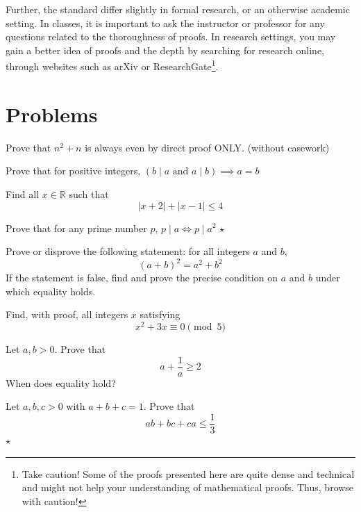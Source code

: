Further, the standard differ slightly in formal research, or an otherwise academic setting. In classes, it is important to ask the instructor or professor for any questions related to the thoroughness of proofs. In research settings, you may gain a better idea of proofs and the depth by searching for research online, through websites such as arXiv or ResearchGate\footnote{Take caution! Some of the proofs presented here are quite dense and technical and might not help your understanding of mathematical proofs. Thus, browse with caution!}. 


\section{Problems}

\begin{problem}
Prove that $n^2 + n$ is always even by direct proof ONLY. (without casework) 
\end{problem}

\begin{problem}
Prove that for positive integers, 
$
(b \mid a \text{ and } a \mid b) \implies a = b
$
\end{problem}

\begin{problem}
    Find all $x \in \mathbb{R}$ such that 
    \[
    |x+2| + |x-1| \leq 4
    \]
\end{problem}

\begin{problem}
Prove that for any prime number $p$,
$
p \mid a \iff p \mid a^2
$  \hfill $\star$
\end{problem}

\begin{problem}
Prove or disprove the following statement: for all integers $a$ and $b$,
\[
(a + b)^2 = a^2 + b^2
\]
If the statement is false, find and prove the precise condition on $a$ and $b$ 
under which equality holds.
\end{problem}

\begin{problem}
Find, with proof, all integers $x$ satisfying
\[
x^2 + 3x \equiv 0 \pmod{5}
\]
\end{problem}

\begin{problem}
Let $a, b > 0$. Prove that 
\[
a + \frac{1}{a} \geq 2
\]
When does equality hold?
\end{problem}

\begin{problem}
Let $a, b, c > 0$ with $a + b + c = 1$. Prove that
\[
ab + bc + ca \leq \frac{1}{3}
\]
\hfill $\star$
\end{problem}

